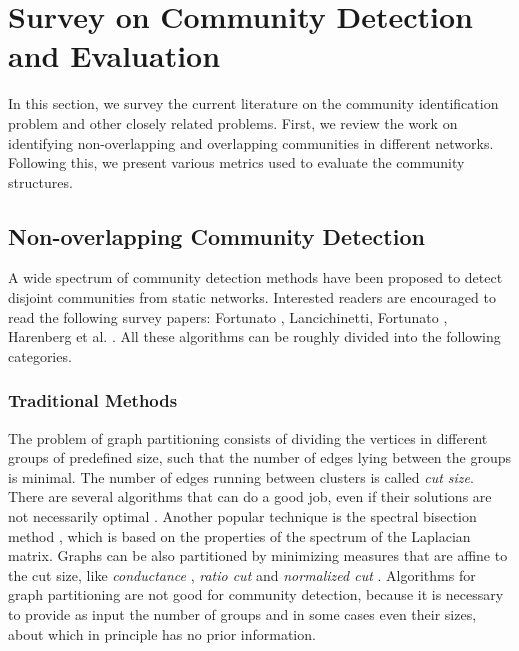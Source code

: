 \section{Survey on Community Detection and Evaluation}
In this section, we survey the current literature on the community identification problem and other closely related problems. First, we
review
the work on identifying non-overlapping and overlapping communities in different networks. Following this, we present various metrics used
to evaluate the community structures.

\subsection{Non-overlapping Community Detection}\label{nonover_comm}
A wide spectrum of community detection methods have been proposed to detect disjoint communities from static networks. Interested readers
are encouraged to read the following survey papers: Fortunato \cite{Fortunato201075}, Lancichinetti, Fortunato \cite{Lancichinetti},
Harenberg et al. \cite{WICS1319}. All these algorithms can
be roughly divided into the following categories.

\subsubsection*{Traditional Methods}
  The problem of graph partitioning consists of dividing the vertices in different groups of
predefined size, such that the number of edges lying between the groups is minimal. The number of edges running between clusters is called 
{\em cut size}. There are several algorithms that can do a good job, even if their solutions are not necessarily optimal
\cite{Pothen:1997,Kernighan70}. Another popular technique is the spectral bisection method \cite{opac-b1007877}, which is based
on the properties of the spectrum of the Laplacian matrix.  Graphs can be also partitioned by minimizing measures that are affine to
the cut size, like {\em conductance}
\cite{Bollobas1998}, {\em ratio cut} \cite{citeulike:10267542} and {\em normalized cut} \cite{Shi:2000}. Algorithms for graph partitioning
are not good for community detection, because it is necessary to provide as input the number of groups and in some cases even their sizes,
about which in principle has no prior information.

